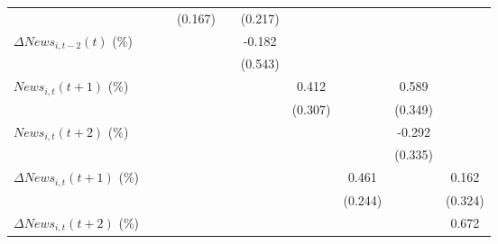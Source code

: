 {\begin{tabular}{l*{9}{c}}
                    &                     &                     &     (0.167)         &                     &     (0.217)         &                     &                     &                     &                     \\
\addlinespace
$ \Delta News_{i,t-2}(t)$ (\%)&                     &                     &                     &                     &      -0.182         &                     &                     &                     &                     \\
                    &                     &                     &                     &                     &     (0.543)         &                     &                     &                     &                     \\
\addlinespace
$ News_{i,t}(t+1)$ (\%)&                     &                     &                     &                     &                     &       0.412         &                     &       0.589         &                     \\
                    &                     &                     &                     &                     &                     &     (0.307)         &                     &     (0.349)         &                     \\
\addlinespace
$ News_{i,t}(t+2)$ (\%)&                     &                     &                     &                     &                     &                     &                     &      -0.292         &                     \\
                    &                     &                     &                     &                     &                     &                     &                     &     (0.335)         &                     \\
\addlinespace
$ \Delta News_{i,t}(t+1)$ (\%)&                     &                     &                     &                     &                     &                     &       0.461\sym{*}  &                     &       0.162         \\
                    &                     &                     &                     &                     &                     &                     &     (0.244)         &                     &     (0.324)         \\
\addlinespace
$ \Delta News_{i,t}(t+2)$ (\%)&                     &                     &                     &                     &                     &                     &                     &                     &       0.672         \\

\end{tabular}}
